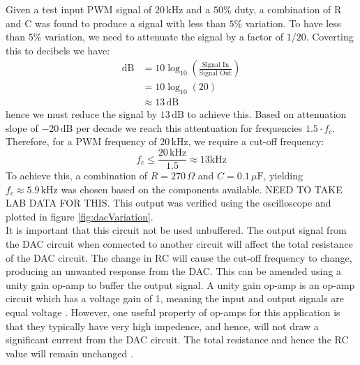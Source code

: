 \documentclass[%
 reprint,
 amsmath,amssymb,
 aps,
]{revtex4-2}
\begin{document}
    Given a test input PWM signal of $20\,\text{kHz}$ and a $50$\% duty, a combination of R and C was found to produce a signal with less than $5$\% variation. To have less than $5$\% variation, we need to attenuate the signal by a factor of $1/20$. Coverting this to decibels we have:
    \begin{align}
        \text{dB} &= 10 \log_{10}\left( \frac{\text{Signal In}}{\text{Signal Out}} \right)\\
                  &= 10 \log_{10}\left( 20 \right)\nonumber\\
                  &\approx 13 \,\text{dB}\nonumber
    \end{align}hence we must reduce the signal by $13\,\text{dB}$ to achieve this. Based on attenuation slope of $-20\,\text{dB}$ per decade we reach this attentuation for frequencies $1.5 \cdot f_c$. Therefore, for a PWM frequency of $20\,\text{kHz}$, we require a cut-off frequency:
    \begin{equation}
        f_c \le \frac{20\,\text{kHz}}{1.5} \approx 13 \text{kHz}
    \end{equation}To achieve this, a combination of $R=270\,\Omega$ and $C=0.1\,\mu\text{F}$, yielding $f_c\approx5.9\,\text{kHz}$ was chosen based on the components available. NEED TO TAKE LAB DATA FOR THIS. This output was verified using the oscilloscope and plotted in figure \ref{fig:dacVariation}.\\

    It is important that this circuit not be used unbuffered. The output signal from the DAC circuit when connected to another circuit will affect the total resistance of the DAC circuit. The change in RC will cause the cut-off frequency to change, producing an unwanted response from the DAC. This can be amended using a unity gain op-amp to buffer the output signal. A unity gain op-amp is an op-amp circuit which has a voltage gain of 1, meaning the input and output signals are equal voltage \cite{unityGain}. However, one useful property of op-amps for this application is that they typically have very high impedence, and hence, will not draw a significant current from the DAC circuit. The total resistance and hence the RC value will remain unchanged \cite{unityGain}.
\end{document}
